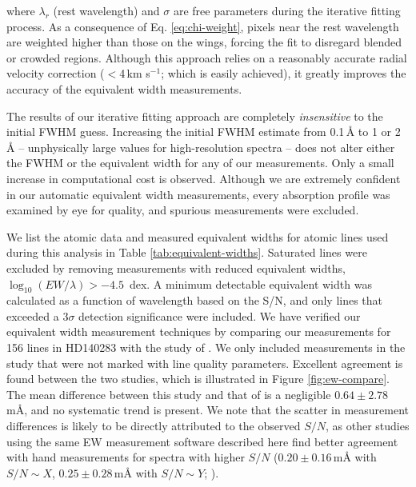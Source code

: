 \documentclass{emulateapj}
\begin{document}
\noindent where $\lambda_{r}$ (rest wavelength) and $\sigma$ are free parameters during the iterative fitting process. As a consequence of Eq. \ref{eq:chi-weight}, pixels near the rest wavelength are weighted higher than those on the wings, forcing the fit to disregard blended or crowded regions. Although this approach relies on a reasonably accurate radial velocity correction ($<$4\,km s$^{-1}$; which is easily achieved), it greatly improves the accuracy of the equivalent width measurements.

The results of our iterative fitting approach are completely \textit{insensitive} to the initial FWHM guess. Increasing the initial FWHM estimate from 0.1\,\AA{} to 1 or 2\,\AA{} -- unphysically large values for high-resolution spectra -- does not alter either the FWHM or the equivalent width for any of our measurements. Only a small increase in computational cost is observed. Although we are extremely confident in our automatic equivalent width measurements, every absorption profile was examined by eye for quality, and spurious measurements were excluded.

We list the atomic data and measured equivalent widths for atomic lines used during this analysis in Table \ref{tab:equivalent-widths}. Saturated lines were excluded by removing measurements with reduced equivalent widths, $\log_{10}{(EW/\lambda)} > -4.5$\, dex. A minimum detectable equivalent width was calculated as a function of wavelength based on the S/N, and only lines that exceeded a $3\sigma$ detection significance were included. We have verified our equivalent width measurement techniques by comparing our measurements for 156 lines in HD140283 with the study of \citet{norris;et-al_1996}. We only included measurements in the \citet{norris;et-al_1996} study that were not marked with line quality parameters. Excellent agreement is found between the two studies, which is illustrated in Figure \ref{fig:ew-compare}. The mean difference between this study and that of \cite{norris;et-al_1996} is a negligible $0.64 \pm 2.78$\,m\AA{}, and no systematic trend is present. We note that the scatter in measurement differences is likely to be directly attributed to the observed $S/N$, as other studies using the same EW measurement software described here find better agreement with hand measurements for spectra with higher $S/N$ ($0.20 \pm 0.16$\,m{\AA} with $S/N \sim X$, $0.25 \pm 0.28$\,m{\AA} with $S/N \sim{} Y$; \citet{frebel;et-al_2013}).
\end{document}
